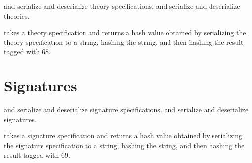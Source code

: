 {} and {} serialize and deserialize theory specifications.
{} and {} serialize and deserialize theories.

{} takes a theory specification and returns a hash value obtained by serializing the
theory specification to a string, hashing the string, and then hashing the result tagged with $68$.

{}

{}

{}

{}


\section{Signatures}

{}
{}
{}
{}

{} and {} serialize and deserialize signature specifications.
{} and {} serialize and deserialize signatures.

{} takes a signature specification and returns a hash value obtained by serializing the
signature specification to a string, hashing the string, and then hashing the result tagged with $69$.

{}

{}

{}

{}


